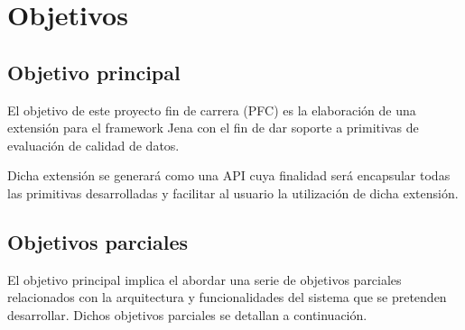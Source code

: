 \chapter{Objetivos}
\label{chap:objetivos}

\section{Objetivo principal}

El objetivo de este proyecto fin de carrera (PFC) es la elaboración de una
extensión para el framework Jena con el fin de dar soporte a primitivas de evaluación de
calidad de datos.

Dicha extensión se generará como una \acs{API} cuya finalidad será encapsular todas
las primitivas desarrolladas y facilitar al usuario la utilización de dicha
extensión. 

\section{Objetivos parciales}

El objetivo principal implica el abordar una serie de objetivos parciales
relacionados con la arquitectura y funcionalidades del sistema que se pretenden
desarrollar. Dichos objetivos parciales se detallan a continuación. 


